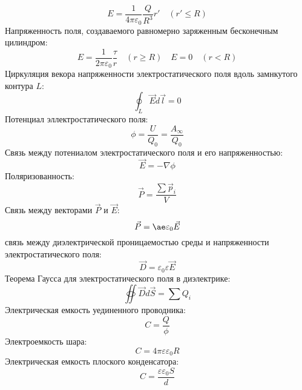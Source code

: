 \documentclass[twoside, a4paperpt, fleqn]{extarticle}
\begin{document}
\begin{equation*}
    E = \frac{1}{4 \pi \varepsilon_0} \frac{Q}{R^3} r' \quad (r' \leq R)
\end{equation*}
Напряженность поля, создаваемого равномерно заряженным бесконечным цилиндром:
\begin{equation*}
 E = \frac{1}{ 2 \pi \varepsilon_0} \frac{\tau}{r} \quad (r \geq R) \quad E = 0 \quad (r < R)
\end{equation*}
Циркуляция векора напряженности электростатического поля вдоль замнкутого контура $L$:
\begin{equation*}
\oint_L \vec{E}{d \vec{l}}= 0
\end{equation*}
Потенциал эллектростатического поля:
\begin{equation*}
    \phi = \frac{U}{Q_0} = \frac{A_{\infty}}{Q_0}
\end{equation*}
Связь между потениалом электростатического поля и его напряженностью:
\begin{equation*}
    \vec{E} = - \nabla \phi
\end{equation*}
Поляризованность:
\begin{equation*}
    \vec{P} = \frac{\sum \vec{p}_i}{V}
\end{equation*}
Связь между векторами $\vec{P}$ и $\vec{E}$:
\begin{equation*}
    \vec{P} = \ae \varepsilon_0 \vec{E}
\end{equation*}
связь между диэлектрической проницаемостью среды и напряженности электростатического поля:
\begin{equation*}
    \vec{D} = \varepsilon_0 \varepsilon \vec{E}
\end{equation*}
Теорема Гаусса для электростатического поля в диэлектрике:
\begin{equation*}
    \oiint \vec{D} d \vec{S} = \sum Q_i
\end{equation*}
Электрическая емкость уединенного проводника:
\begin{equation*}
    C = \frac{Q}{\phi}
\end{equation*}
Электроемкость шара:
\begin{equation*}
    C = 4 \pi \varepsilon \varepsilon_0 R
\end{equation*}
Электрическая емкость плоского конденсатора:
\begin{equation*}
    C = \frac{\varepsilon \varepsilon_0 S}{d}
\end{equation*}
\end{document}
